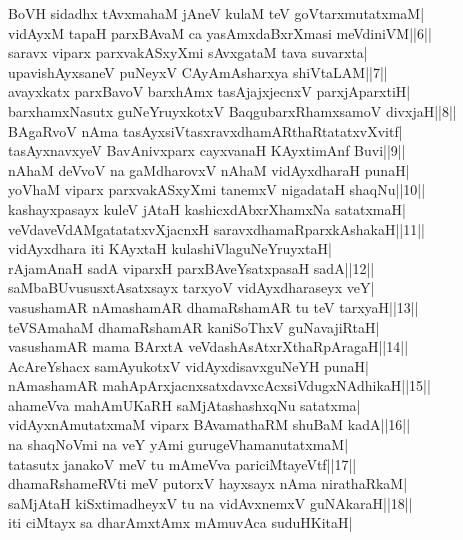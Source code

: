 \documentclass{article}
\begin{document}
BoVH sidadhx tAvxmahaM jAneV kulaM teV goVtarxmutatxmaM|\\
vidAyxM tapaH parxBAvaM ca yasAmxdaBxrXmasi meVdiniVM||6||\\
saravx viparx parxvakASxyXmi sAvxgataM tava suvarxta|\\
upavishAyxsaneV puNeyxV CAyAmAsharxya shiVtaLAM||7||\\
avayxkatx parxBavoV barxhAmx tasAjajxjecnxV parxjAparxtiH|\\
barxhamxNasutx guNeYruyxkotxV BaqgubarxRhamxsamoV divxjaH||8||\\
BAgaRvoV nAma tasAyxsiVtasxravxdhamARthaRtatatxvXvitf|\\
tasAyxnavxyeV BavAnivxparx cayxvanaH KAyxtimAnf Buvi||9||\\
nAhaM deVvoV na gaMdharovxV nAhaM vidAyxdharaH punaH|\\
yoVhaM viparx parxvakASxyXmi tanemxV nigadataH shaqNu||10||\\
kashayxpasayx kuleV jAtaH kashicxdAbxrXhamxNa satatxmaH|\\
veVdaveVdAMgatatatxvXjacnxH saravxdhamaRparxkAshakaH||11||\\
vidAyxdhara iti KAyxtaH kulashiVlaguNeYruyxtaH|\\
rAjamAnaH sadA viparxH parxBAveYsatxpasaH sadA||12||\\
saMbaBUvususxtAsatxsayx tarxyoV vidAyxdharaseyx veY|\\
vasushamAR nAmashamAR dhamaRshamAR tu teV tarxyaH||13||\\
teVSAmahaM dhamaRshamAR kaniSoThxV guNavajiRtaH|\\
vasushamAR mama BArxtA veVdashAsAtxrXthaRpAragaH||14||\\
AcAreYshacx samAyukotxV vidAyxdisavxguNeYH punaH|\\
nAmashamAR mahApArxjacnxsatxdavxcAcxsiVdugxNAdhikaH||15||\\
ahameVva mahAmUKaRH saMjAtashashxqNu satatxma|\\
vidAyxnAmutatxmaM viparx BAvamathaRM shuBaM kadA||16||\\
na shaqNoVmi na veY yAmi gurugeVhamanutatxmaM|\\
tatasutx janakoV meV tu mAmeVva pariciMtayeVtf||17||\\
dhamaRshameRVti meV putorxV hayxsayx nAma nirathaRkaM|\\
saMjAtaH kiSxtimadheyxV tu na vidAvxnemxV guNAkaraH||18||\\
iti ciMtayx sa dharAmxtAmx mAmuvAca suduHKitaH|\\
\end{document}

